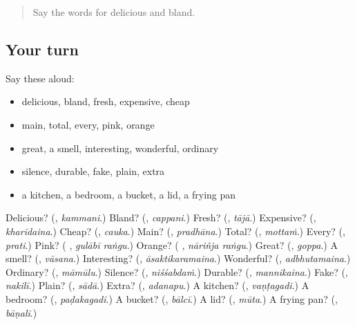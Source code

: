 \label{lesson:TE-R183-second-pass-words-from-chapters-179-183}



\begin{quote}
Say the words for delicious and bland.
\end{quote}

\subsection*{Your turn}
Say these aloud:

\begin{itemize}
\raggedright
  \item delicious, bland, fresh, expensive, cheap
  \item main, total, every, pink, orange
  \item great, a smell, interesting, wonderful, ordinary
  \item silence, durable, fake, plain, extra
  \item a kitchen, a bedroom, a bucket, a lid, a frying pan
\end{itemize}

\begin{tcolorbox}[breakable,colback=teal!4,colframe=teal!35!black,title={Before you move on}]
Delicious? (\textbf{}, \emph{kammani}.) Bland? (\textbf{}, \emph{cappani}.) Fresh? (\textbf{}, \emph{tājā}.) Expensive? (\textbf{}, \emph{kharīdaina}.) Cheap? (\textbf{}, \emph{cauka}.) Main? (\textbf{}, \emph{pradhāna}.) Total? (\textbf{}, \emph{mottaṁ}.) Every? (\textbf{}, \emph{prati}.) Pink? (\textbf{ }, \emph{gulābī raṅgu}.) Orange? (\textbf{ }, \emph{nāriñja raṅgu}.) Great? (\textbf{}, \emph{goppa}.) A smell? (\textbf{}, \emph{vāsana}.) Interesting? (\textbf{}, \emph{āsaktikaramaina}.) Wonderful? (\textbf{}, \emph{adbhutamaina}.) Ordinary? (\textbf{}, \emph{māmūlu}.) Silence? (\textbf{}, \emph{niśśabdaṁ}.) Durable? (\textbf{}, \emph{mannikaina}.) Fake? (\textbf{}, \emph{nakilī}.) Plain? (\textbf{}, \emph{sādā}.) Extra? (\textbf{}, \emph{adanapu}.) A kitchen? (\textbf{}, \emph{vaṇṭagadi}.) A bedroom? (\textbf{}, \emph{paḍakagadi}.) A bucket? (\textbf{}, \emph{bālcī}.) A lid? (\textbf{}, \emph{mūta}.) A frying pan? (\textbf{}, \emph{bāṇali}.)
\end{tcolorbox}

